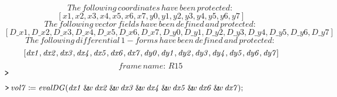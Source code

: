 \documentclass{article}
\begin{document}
\begin{dmath*}
\mathit{The\,following\,coordinates\,have\,been\,protected:\,} 
\end{dmath*}
\vspace{-\bigskipamount}
\begin{dmath*}
\left[\mathit{x1} ,\mathit{x2} ,\mathit{x3} ,\mathit{x4} ,\mathit{x5} ,\mathit{x6} ,\mathit{x7} ,\mathit{y0} ,\mathit{y1} ,\mathit{y2} ,\mathit{y3} ,\mathit{y4} ,\mathit{y5} ,\mathit{y6} ,\mathit{y7} \right]
\end{dmath*}
\vspace{-\bigskipamount}
\begin{dmath*}
\mathit{The\,following\,vector\,fields\,have\,been\,defined\,and\,protected:\,} 
\end{dmath*}
\vspace{-\bigskipamount}
\begin{dmath*}
\left[\textit{D\_x1} ,\textit{D\_x2} ,\textit{D\_x3} ,\textit{D\_x4} ,\textit{D\_x5} ,\textit{D\_x6} ,\textit{D\_x7} ,\textit{D\_y0} ,\textit{D\_y1} ,\textit{D\_y2} ,\textit{D\_y3} ,\textit{D\_y4} ,\textit{D\_y5} ,\textit{D\_y6} ,\textit{D\_y7} \right]
\end{dmath*}
\vspace{-\bigskipamount}
\begin{dmath*}
\mathit{The\,following\,differential\,1-forms\,have\,been\,defined\,and\,protected:\,} 
\end{dmath*}
\vspace{-\bigskipamount}
\begin{dmath*}
\left[\mathit{dx1} ,\mathit{dx2} ,\mathit{dx3} ,\mathit{dx4} ,\mathit{dx5} ,\mathit{dx6} ,\mathit{dx7} ,\mathit{dy0} ,\mathit{dy1} ,\mathit{dy2} ,\mathit{dy3} ,\mathit{dy4} ,\mathit{dy5} ,
\\
\mathit{dy6} ,\mathit{dy7} \right]
\end{dmath*}
\vspace{-\bigskipamount}
\begin{dmath}\label{(2)}
\mathit{frame\,name:\,R15\,} 
\end{dmath}
\mapleinput
{$ \displaystyle \texttt{>\,} \, $}

\mapleinput
{$ \displaystyle \texttt{>\,} \mathit{vol7} \coloneqq \mathit{evalDG} (\mathit{dx1} \:\&\!\!w \,\mathit{dx2} \:\&\!\!w \,\mathit{dx3} \:\&\!\!w \,\mathit{dx4} \:\&\!\!w \,\mathit{dx5} \:\&\!\!w \,\mathit{dx6} \:\&\!\!w \,\mathit{dx7}); $}
\end{document}
